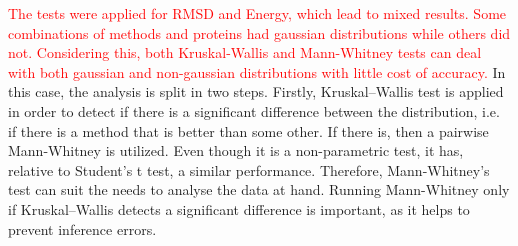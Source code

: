 \textcolor{red}{
The tests were applied for RMSD and Energy, which lead to mixed results. Some
combinations of methods and proteins had gaussian distributions while others did
not. Considering this, both Kruskal-Wallis and Mann-Whitney tests can deal with
both gaussian and non-gaussian distributions with little cost of accuracy.
}
%
% 
%
%
In this case, the analysis is split in two steps.
Firstly, Kruskal–Wallis test is applied in order
to detect if there is a significant difference between the distribution, i.e.
if there is a method that is better than some other. If there is, then
a pairwise Mann-Whitney is utilized. Even though it is a non-parametric test, it
has, relative to Student's t test, a similar performance. Therefore,
Mann-Whitney's test can suit the needs to analyse the data at hand. Running
Mann-Whitney only if Kruskal–Wallis detects a significant difference is
important, as it helps to prevent inference errors.

